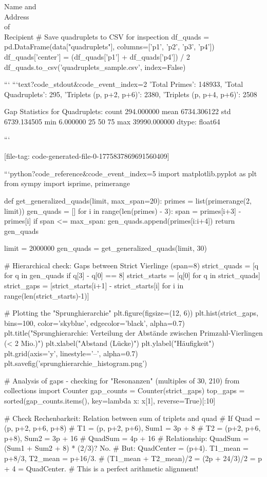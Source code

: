 \documentclass[fontsize=12pt, paper=a4]{scrlttr2}
\begin{document}
\begin{letter}{Name and \\ Address \\ of \\ Recipient}
# Save quadruplets to CSV for inspection
df_quads = pd.DataFrame(data["quadruplets"], columns=['p1', 'p2', 'p3', 'p4'])
df_quads['center'] = (df_quads['p1'] + df_quads['p4']) / 2
df_quads.to_csv('quadruplets_sample.csv', index=False)


```
```text?code_stdout&code_event_index=2
{'Total Primes': 148933, 'Total Quadruplets': 295, 'Triplets (p, p+2, p+6)': 2380, 'Triplets (p, p+4, p+6)': 2508}

Gap Statistics for Quadruplets:
count      294.000000
mean      6734.306122
std       6739.134505
min          6.000000
25%
50%
75%
max      39990.000000
dtype: float64

```

[file-tag: code-generated-file-0-1775837869691560409]

```python?code_reference&code_event_index=5
import matplotlib.pyplot as plt
from sympy import isprime, primerange

def get_generalized_quads(limit, max_span=20):
    primes = list(primerange(2, limit))
    gen_quads = []
    for i in range(len(primes) - 3):
        span = primes[i+3] - primes[i]
        if span <= max_span:
            gen_quads.append(primes[i:i+4])
    return gen_quads

limit = 2000000
gen_quads = get_generalized_quads(limit, 30)

# Hierarchical check: Gaps between Strict Vierlinge (span=8)
strict_quads = [q for q in gen_quads if q[3] - q[0] == 8]
strict_starts = [q[0] for q in strict_quads]
strict_gaps = [strict_starts[i+1] - strict_starts[i] for i in range(len(strict_starts)-1)]

# Plotting the "Sprunghierarchie"
plt.figure(figsize=(12, 6))
plt.hist(strict_gaps, bins=100, color='skyblue', edgecolor='black', alpha=0.7)
plt.title("Sprunghierarchie: Verteilung der Abstände zwischen Primzahl-Vierlingen (< 2 Mio.)")
plt.xlabel("Abstand (Lücke)")
plt.ylabel("Häufigkeit")
plt.grid(axis='y', linestyle='--', alpha=0.7)
plt.savefig('sprunghierarchie_histogram.png')

# Analysis of gaps - checking for "Resonanzen" (multiples of 30, 210)
from collections import Counter
gap_counts = Counter(strict_gaps)
top_gaps = sorted(gap_counts.items(), key=lambda x: x[1], reverse=True)[:10]

# Check Rechenbarkeit: Relation between sum of triplets and quad
# If Quad = (p, p+2, p+6, p+8)
# T1 = (p, p+2, p+6), Sum1 = 3p + 8
# T2 = (p+2, p+6, p+8), Sum2 = 3p + 16
# QuadSum = 4p + 16
# Relationship: QuadSum = (Sum1 + Sum2 + 8) * (2/3)? No.
# But: QuadCenter = (p+4). T1_mean = p+8/3, T2_mean = p+16/3.
# (T1_mean + T2_mean)/2 = (2p + 24/3)/2 = p + 4 = QuadCenter.
# This is a perfect arithmetic alignment!


\end{letter}
\end{document}
